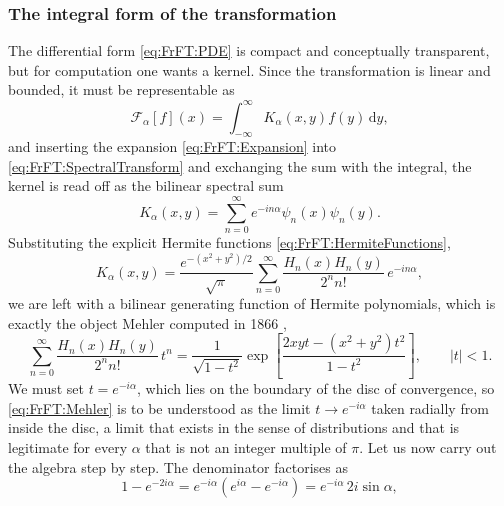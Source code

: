 		\subsubsection{The integral form of the transformation}

			The differential form \eqref{eq:FrFT:PDE} is compact and conceptually transparent, but for computation one wants a kernel. Since the transformation is linear and bounded, it must be representable as
			\begin{equation}\label{eq:FrFT:KernelDef}
				\mathcal{F}_{\alpha}[f](x) = \int_{-\infty}^{\infty}K_{\alpha}(x,y)f(y)\,\mathrm{d}y,
			\end{equation}
			and inserting the expansion \eqref{eq:FrFT:Expansion} into \eqref{eq:FrFT:SpectralTransform} and exchanging the sum with the integral, the kernel is read off as the bilinear spectral sum
			\begin{equation}\label{eq:FrFT:KernelSum}
				K_{\alpha}(x,y) = \sum_{n=0}^{\infty}e^{-in\alpha}\psi_{n}(x)\psi_{n}(y).
			\end{equation}
			Substituting the explicit Hermite functions \eqref{eq:FrFT:HermiteFunctions},
			\begin{equation}\label{eq:FrFT:KernelHermite}
				K_{\alpha}(x,y) = \frac{e^{-\left(x^{2}+y^{2}\right)/2}}{\sqrt{\pi}}\sum_{n=0}^{\infty}\frac{H_{n}(x)H_{n}(y)}{2^{n}n!}\,e^{-in\alpha},
			\end{equation}
			we are left with a bilinear generating function of Hermite polynomials, which is exactly the object Mehler computed in 1866 \citep{mehler1866entwicklung},
			\begin{equation}\label{eq:FrFT:Mehler}
				\sum_{n=0}^{\infty}\frac{H_{n}(x)H_{n}(y)}{2^{n}n!}\,t^{n} = \frac{1}{\sqrt{1-t^{2}}}\exp\left[\frac{2xyt - \left(x^{2}+y^{2}\right)t^{2}}{1-t^{2}}\right], \qquad |t|<1.
			\end{equation}
			We must set $t = e^{-i\alpha}$, which lies on the boundary of the disc of convergence, so \eqref{eq:FrFT:Mehler} is to be understood as the limit $t\to e^{-i\alpha}$ taken radially from inside the disc, a limit that exists in the sense of distributions and that is legitimate for every $\alpha$ that is not an integer multiple of $\pi$. Let us now carry out the algebra step by step. The denominator factorises as
			\begin{equation}\label{eq:FrFT:Denominator}
				1 - e^{-2i\alpha} = e^{-i\alpha}\left(e^{i\alpha} - e^{-i\alpha}\right) = e^{-i\alpha}\,2i\sin\alpha,
			\end{equation}
